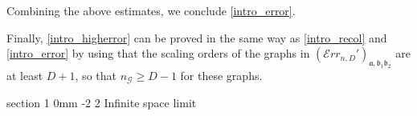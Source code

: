 \documentclass{article}
\makeatletter
\newcommand{\1}{\mathds{1}}
\numberwithin{equation}{section}
\newcommand{\al}{\alpha}
\newcommand{\fa}{{\mathfrak a}}
\newcommand{\fb}{{\mathfrak b}}
\renewcommand{\cal}{\mathcal}
\newcommand{\wt}{\widetilde}
\renewcommand{\geq}{\geqslant}
\renewcommand{\ge}{\geq}
\newcommand{\dashed}{\text{diffusive}}
\theoremstyle{plain} %
\theoremstyle{remark}
\newcommand{\cob}{\color{purple}}
\newcommand{\Err}{{\mathcal Err}}
\renewcommand{\section}{\@startsection
{section}%
{1}%
{0mm}%
{-2\baselineskip}%
{2\baselineskip}%
{\normalfont\large\scshape\centering}} %
\makeatother
\begin{document}
Combining the above estimates, we conclude \eqref{intro_error}. 

Finally, \eqref{intro_higherror} can be proved in the same way as \eqref{intro_recol} and \eqref{intro_error} by using that the scaling orders of the graphs in $(\Err_{n,D}')_{\fa,\fb_1\fb_2}$ are at least $ D +1$, so that $n_{\cal G}\ge D-1$ for these graphs.



\section{Infinite space limit}\label{sec infspace}

\end{document}
